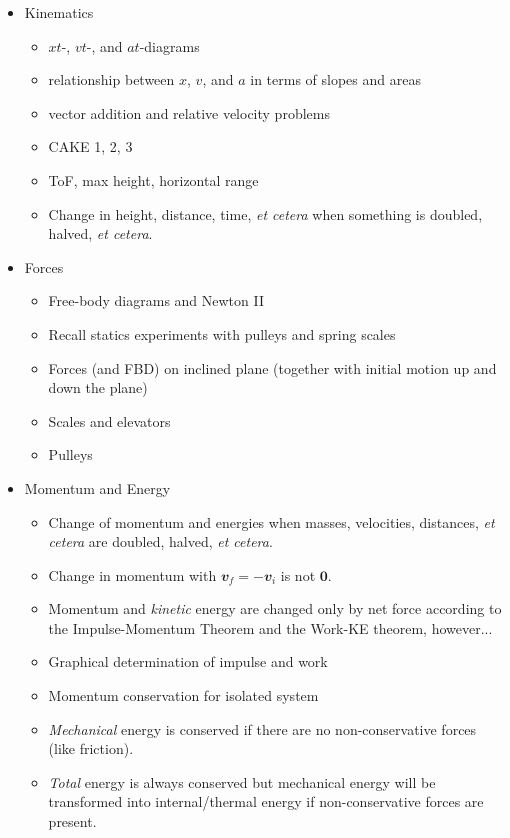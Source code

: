 \begin{itemize}
\item Kinematics
	\begin{itemize}
	\item $xt$-, $vt$-, and $at$-diagrams
	\item relationship between $x$, $v$, and $a$ in terms of slopes and areas
	\item vector addition and relative velocity problems
	\item CAKE 1, 2, 3
	\item ToF, max height, horizontal range
	\item Change in height, distance, time, {\it et cetera} when something is doubled, halved, {\it et cetera}.
	\end{itemize}
\item Forces
	\begin{itemize}
	\item Free-body diagrams and Newton II
	\item Recall statics experiments with pulleys and spring scales
	\item Forces (and FBD) on inclined plane (together with initial motion up and down the plane)
	\item Scales and elevators
	\item Pulleys
	\end{itemize}
\item Momentum and Energy
	\begin{itemize}
	\item Change of momentum and energies when masses, velocities, distances, {\it et cetera} are doubled, halved, {\it et cetera}.
	\item Change in momentum with $𝒗_f = -𝒗_i$ is not $𝟎$.
	\item Momentum and {\em kinetic} energy are changed only by net force according to the Impulse-Momentum Theorem and the Work-KE theorem, however...
	\item Graphical determination of impulse and work
	\item Momentum conservation for isolated system
	\item {\em Mechanical} energy is conserved if there are no non-conservative forces (like friction). 
	\item {\em Total} energy is always conserved but mechanical energy will be transformed into internal/thermal energy if non-conservative forces are present. 
	\end{itemize}
\end{itemize}

